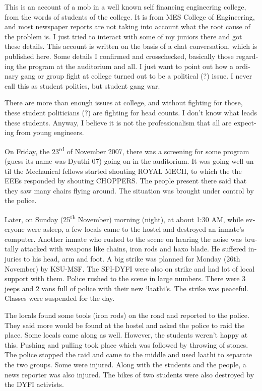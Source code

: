 \vskip 2pt
\begin{english}
This is an account of a mob in a well known self financing engineering college, from the words of students of the college. It is from MES College of Engineering, and most newspaper reports are not taking into account what the root cause of the problem is. I just tried to interact with some of my juniors there and got these details. This account is written on the basis of a chat conversation, which is published here. Some details I confirmed and crosschecked, basically those regarding the program at the auditorium and all. I just want to point out how a ordinary gang or group fight at college turned out to be a political (?) issue. I never call this as student politics, but student gang war.

There are more than enough issues at college, and without fighting for those, these student politicians (?) are fighting for head counts. I don’t know what leads these students. Anyway, I believe it is not the professionalism that all are expecting from young engineers.

On Friday, the 23\textsuperscript{rd} of November 2007, there was a screening for some program (guess its name was Dyuthi 07) going on in the auditorium. It was going well until the Mechanical fellows started shouting ROYAL MECH, to which the the EEEs responded by shouting CHOPPERS. The people present there said that they saw many chairs flying around. The situation was brought under control by the police.

Later, on Sunday (25\textsuperscript{th} November) morning (night), at about 1:30 AM, while everyone were asleep, a few locals came to the hostel and destroyed an inmate’s computer. Another inmate who rushed to the scene on hearing the noise was brutally attacked with weapons like chains, iron rods and haxo blade. He suffered injuries to his head, arm and foot.
A big strike was planned for Monday (26th November) by KSU-MSF. The SFI-DYFI were also on strike and had lot of local support with them. Police rushed to the scene in large numbers. There were 3 jeeps and 2 vans full of police with their new ‘laathi’s. The strike was peaceful. Classes were suspended for the day.

The locals found some tools (iron rods) on the road and reported to the police. They said more would be found at the hostel and asked the police to raid the place. Some locals came along as well. However, the students weren't happy at this. Pushing and pulling took place which was followed by throwing of stones. The police stopped the raid and came to the middle and used laathi to separate the two groups. Some were injured.
Along with the students and the people, a news reporter was also injured. The bikes of two students were also destroyed by the DYFI activists.


\end{english}
